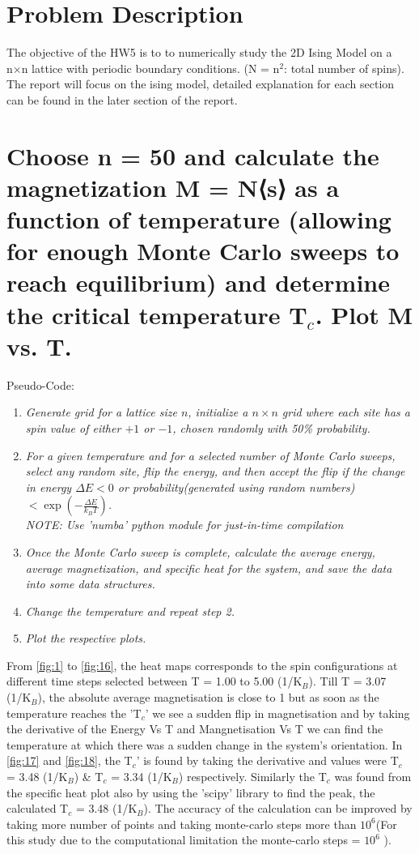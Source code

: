 \documentclass[11pt]{article}
\begin{document}
\section{Problem Description}
The objective of the HW5 is to to numerically study the 2D Ising Model on a n×n lattice with periodic boundary conditions. (N = n$^2$: total number of spins). The report will focus on the ising model, detailed explanation for each section can be found in the later section of the report.

\section{Choose n = 50 and calculate the magnetization M = N⟨s⟩ as a function of temperature (allowing for
enough Monte Carlo sweeps to reach equilibrium) and determine the critical temperature T$_c$. Plot M
vs. T.}

Pseudo-Code:
\begin{enumerate}
    \item \textit{Generate grid for a lattice size \( n \), initialize a \( n \times n \) grid where each site has a spin value of either \( +1 \) or \( -1 \), chosen randomly with 50\% probability.}
    \item \textit{For a given temperature and for a selected number of Monte Carlo sweeps, select any random site, flip the energy, and then accept the flip if the change in energy \( \Delta E < 0 \) or probability(generated using random numbers) \( < \exp\left(-\frac{\Delta E}{k_B T}\right) \).\cite{ref1}\cite{ref2} \\
NOTE: Use 'numba' python module for just-in-time compilation \cite{ref3}}
    \item \textit{Once the Monte Carlo sweep is complete, calculate the average energy, average magnetization, and specific heat for the system, and save the data into some data structures.}
    \item \textit{Change the temperature and repeat step 2.}
    \item \textit{Plot the respective plots.}
\end{enumerate}

From \autoref{fig:1} to \autoref{fig:16}, the heat maps corresponds to the spin configurations at different time steps selected between T = 1.00 to 5.00 (1/K$_B$). Till T = 3.07 (1/K$_B$), the absolute average magnetisation is close to 1 but as soon as the temperature reaches the 'T$_c$' we see a sudden flip in magnetisation and by taking the derivative of the Energy Vs T and Mangnetisation Vs T we can find the temperature at which there was a sudden change in the system's orientation. In \autoref{fig:17} and \autoref{fig:18}, the T$_c$' is found by taking the derivative and values were T$_c$ = 3.48 (1/K$_B$) \& T$_c$ = 3.34 (1/K$_B$) respectively. Similarly the T$_c$ was found from the specific heat plot also by using the 'scipy' library to find the peak, the calculated T$_c$ = 3.48 (1/K$_B$). The accuracy of the calculation can be improved by taking more number of points and taking monte-carlo steps more than $10^6$(For this study due to the computational limitation the monte-carlo steps = $10^6$ ).
\end{document}
